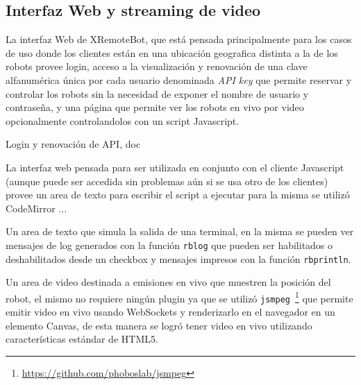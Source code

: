 \subsection{Interfaz Web y streaming de video}

La interfaz Web de XRemoteBot, que está pensada principalmente para los casos
de uso donde los clientes están en una ubicación geografica distinta a la de
los robots provee login, acceso a la visualización y renovación de una
clave alfanumérica única por cada usuario denominada \textit{API key} que
permite reservar y controlar los robots sin la necesidad de exponer el nombre
de usuario y contraseña, y una página que permite ver los robots en vivo por
video opcionalmente controlandolos con un script Javascript.

Login y renovación de API, doc

La interfaz web pensada para ser utilizada en conjunto con el cliente
Javascript (aunque puede ser accedida sin problemas aún si se usa
otro de los clientes) provee un area de texto para escribir el script
a ejecutar %
para la misma se utilizó CodeMirror ...

Un area de texto que simula la salida de una terminal, en la misma
se pueden ver mensajes de log generados con la función
\texttt{rblog} que pueden ser habilitados o deshabilitados desde un
checkbox y mensajes impresos con la función \texttt{rbprintln}.

Un area de video destinada a emisiones en vivo que muestren la posición
del robot, el mismo no requiere ningún plugin ya que se utilizó
\texttt{jsmpeg}~\footnote{\url{https://github.com/phoboslab/jsmpeg}}
que permite emitir video en vivo usando WebSockets y renderizarlo
en el navegador en un elemento Canvas, de esta manera se logró tener
video en vivo utilizando características estándar de HTML5.
